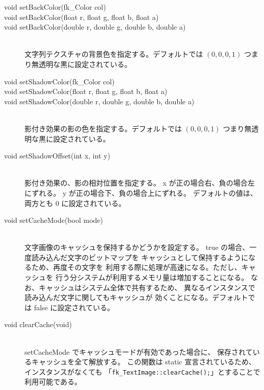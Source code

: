 \begin{description}
\item[void setBackColor(fk\_Color col)]
\item[void setBackColor(float r, float g, float b, float a)]
\item[void setBackColor(double r, double g, double b, double a)] ~ \\
	文字列テクスチャの背景色を指定する。デフォルトでは
	\((0, 0, 0, 1)\) つまり無透明な黒に設定されている。\\

\item[void setShadowColor(fk\_Color col)]
\item[void setShadowColor(float r, float g, float b, float a)]
\item[void setShadowColor(double r, double g, double b, double a)] ~ \\
	影付き効果の影の色を指定する。デフォルトでは
	\((0, 0, 0, 1)\) つまり無透明な黒に設定されている。\\

\item[void setShadowOffset(int x, int y)] ~ \\
	影付き効果の、影の相対位置を指定する。
	x が正の場合右、負の場合左にずれる。
	y が正の場合下、負の場合上にずれる。
	デフォルトの値は、両方とも 0 に設定されている。\\

\item[void setCacheMode(bool mode)] ~ \\
	文字画像のキャッシュを保持するかどうかを設定する。
	true の場合、一度読み込んだ文字のビットマップを
	キャッシュとして保持するようになるため、再度その文字を
	利用する際に処理が高速になる。ただし、キャッシュを
	行う分システムが利用するメモリ量は増加することになる。
	なお、キャッシュはシステム全体で共有するため、
	異なるインスタンスで読み込んだ文字に関してもキャッシュが
	効くことになる。デフォルトでは false に設定されている。\\

\item[void clearCache(void)] ~ \\
	setCacheMode でキャッシュモードが有効であった場合に、
	保存されているキャッシュを全て解放する。
	この関数は static 宣言されているため、
	インスタンスがなくても
	「\verb+fk_TextImage::clearCache();+」とすることで
	利用可能である。
\end{description}


